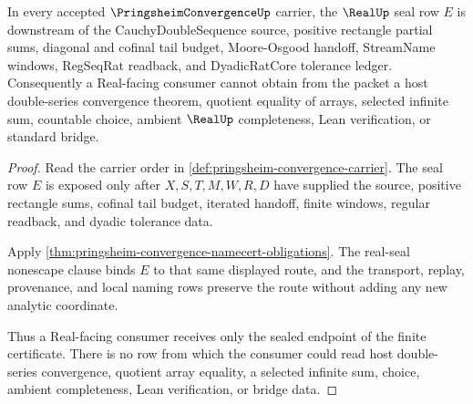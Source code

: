 \begin{theorem}
\label{thm:pringsheim-convergence-real-seal-nonescape}
In every accepted $\PringsheimConvergenceUp$ carrier, the $\RealUp$ seal row $E$ is downstream of the CauchyDoubleSequence source, positive rectangle partial sums, diagonal and cofinal tail budget, Moore-Osgood handoff, StreamName windows, RegSeqRat readback, and DyadicRatCore tolerance ledger. Consequently a Real-facing consumer cannot obtain from the packet a host double-series convergence theorem, quotient equality of arrays, selected infinite sum, countable choice, ambient $\RealUp$ completeness, Lean verification, or standard bridge.
\end{theorem}
\begin{proof}
Read the carrier order in \autoref{def:pringsheim-convergence-carrier}. The seal row $E$ is exposed only after $X,S,T,M,W,R,D$ have supplied the source, positive rectangle sums, cofinal tail budget, iterated handoff, finite windows, regular readback, and dyadic tolerance data.

Apply \autoref{thm:pringsheim-convergence-namecert-obligations}. The real-seal nonescape clause binds $E$ to that same displayed route, and the transport, replay, provenance, and local naming rows preserve the route without adding any new analytic coordinate.

Thus a Real-facing consumer receives only the sealed endpoint of the finite certificate. There is no row from which the consumer could read host double-series convergence, quotient array equality, a selected infinite sum, choice, ambient completeness, Lean verification, or bridge data.
\end{proof}



